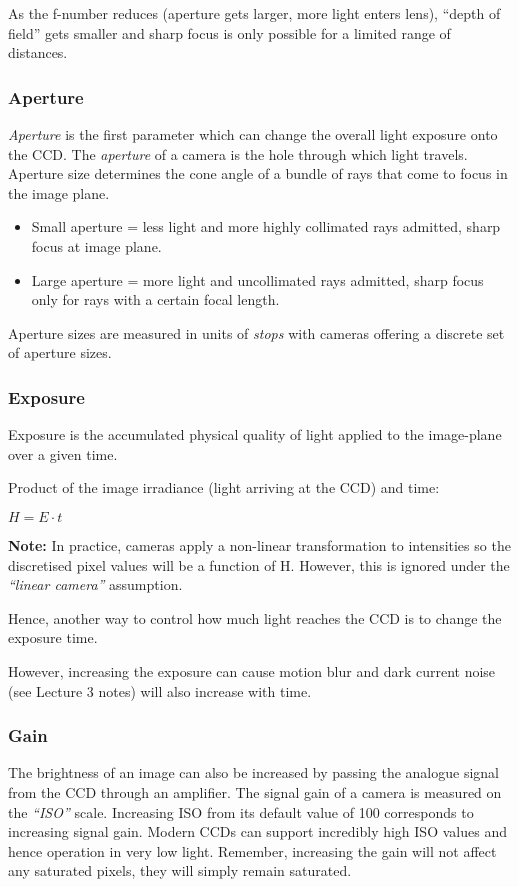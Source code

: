 \documentclass{article}\author{Hawley, Adam}
\begin{document}
As the f-number reduces (aperture gets larger, more light enters lens), ``depth of field'' gets smaller and sharp focus is only possible for a limited range of distances. 


\subsubsection{Aperture}
{\it Aperture} is the first parameter which can change the overall light exposure onto the CCD. 
The {\it aperture} of a camera is the hole through which light travels. 
Aperture size determines the cone angle of a bundle of rays that come to focus in the image plane. 

\begin{itemize}
	\item Small aperture = less light and more highly collimated rays admitted, sharp focus at image plane.

	\item Large aperture = more light and uncollimated rays admitted, sharp focus only for rays with a certain focal length.
\end{itemize}

Aperture sizes are measured in units of {\it stops} with cameras offering a discrete set of aperture sizes.

\subsubsection{Exposure}
Exposure is the accumulated physical quality of light applied to the image-plane over a given time.

Product of the image irradiance (light arriving at the CCD) and time: 
\centerline{$H = E\cdot t$}

{\bf Note:} In practice, cameras apply a non-linear transformation to intensities so the discretised pixel values will be a function of H. However, this is ignored under the {\it ``linear camera''} assumption.

Hence, another way to control how much light reaches the CCD is to change the exposure time.

However, increasing the exposure can cause motion blur and dark current noise (see Lecture 3 notes) will also increase with time.

\subsubsection{Gain}
The brightness of an image can also be increased by passing the analogue signal from the CCD through an amplifier.
The signal gain of a camera is measured on the {\it ``ISO''} scale.
Increasing ISO from its default value of 100 corresponds to increasing signal gain.
Modern CCDs can support incredibly high ISO values and hence operation in very low light.
Remember, increasing the gain will not affect any saturated pixels, they will simply remain saturated.
\end{document}

